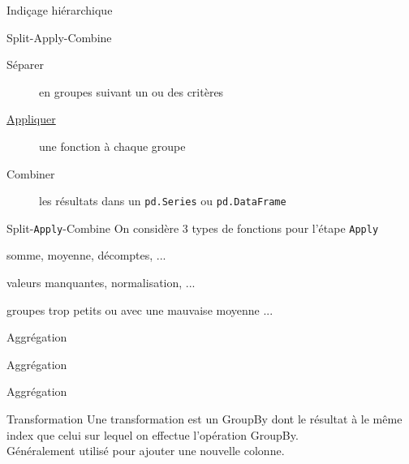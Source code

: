 \begin{frame}{Indiçage hiérarchique}
\end{frame}

\begin{frame}{Split-Apply-Combine}
  \begin{description}
    \item[Séparer]   en groupes suivant un ou des critères
    \item[\underline{Appliquer}] une fonction à chaque groupe
    \item[Combiner]  les résultats dans un \texttt{pd.Series} ou \texttt{pd.DataFrame}
  \end{description}
\end{frame}

\begin{frame}{Split-\texttt{Apply}-Combine}
  On considère 3 types de fonctions pour l'étape \texttt{Apply}
  \begin{description}[r,labelwidth=\widthof{   Transformation :}]
    \item[Agrégation :]   somme, moyenne, décomptes, ... 
    \item[Transformation :] valeurs manquantes, normalisation, ... 
    \item[Filtrage :]  groupes trop petits ou avec une mauvaise moyenne ... 
  \end{description}
\end{frame}

\begin{frame}{Aggrégation}
\end{frame}

\begin{frame}{Aggrégation}
\end{frame}

\begin{frame}{Aggrégation}
\end{frame}

\begin{frame}{Transformation}
  Une transformation est un GroupBy dont le résultat à le même index que celui sur lequel on effectue l'opération GroupBy. \\
  Généralement utilisé pour ajouter une nouvelle colonne.
\end{frame}

